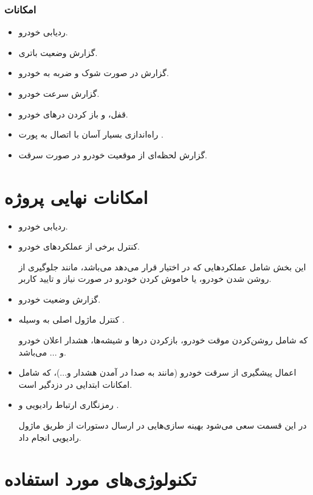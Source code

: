 \documentclass[a4paper,12pt]{report}
\begin{document}
	\subsubsection{
		امکانات
	}\label{subsubsec3:subsec3:sec3:chap1}
	\begin{itemize}[nosep]\label{item1:subsec3:sec2:chap1}
		\item
			ردیابی خودرو.
		\item
			گزارش وضعیت باتری.
		\item
			گزارش در صورت شوک و ضربه به خودرو.
		\item
			گزارش سرعت خودرو.
		\item
			قفل، و باز کردن در‌های خودرو.
		\item
			راه‌اندازی بسیار آسان با اتصال به پورت
			.
		\item
			گزارش لحظه‌ای از موقعیت خودرو در صورت سرقت.

	\end{itemize}

	\section{
	امکانات نهایی پروژه
	}\label{sec4:chap1}
	\begin{itemize}[nosep]\label{item1:sec4:chap1}
		\item
			ردیابی خودرو.
		\item
			کنترل برخی از عملکرد‌های خودرو.

			این بخش شامل عملکرد‌هایی که
			در اختیار قرار می‌دهد می‌باشد،‌ مانند جلوگیری از روشن شدن خودرو، یا خاموش کردن خودرو در صورت نیاز و تایید کاربر.
		\item
			گزارش وضعیت خودرو.
		\item
			کنترل ماژول اصلی به وسیله
			.

			که شامل روشن‌کردن موقت خودرو، بازکردن درها و شیشه‌ها، هشدار اعلان خودرو و ... می‌باشد.
		\item
			اعمال پیشگیری از سرقت خودرو (مانند به صدا در آمدن هشدار و...)، که شامل امکانات ابتدایی در دزدگیر است.
		\item
			رمزنگاری ارتباط رادیویی و
			.

			در این قسمت سعی می‌شود بهینه سازی‌هایی در ارسال دستورات
			 از طریق ماژول رادیویی انجام داد.
	\end{itemize}
	\newpage
	\section{
		تکنولوژی‌های مورد استفاده
	}\label{sec5:chap1}
\end{document}
